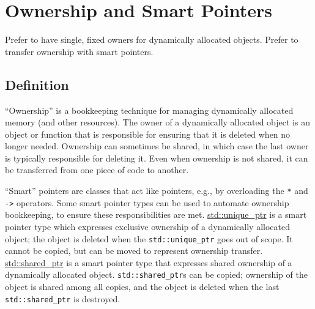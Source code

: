 
\section{Ownership and Smart Pointers}\label{sec:ownership-and-smart-pointers}
Prefer to have single, fixed owners for dynamically allocated objects. Prefer to transfer ownership with smart pointers.

\subsection{Definition}
\enquote{Ownership} is a bookkeeping technique for managing dynamically allocated memory (and other resources). The owner of a dynamically allocated object is an object or function that is responsible for ensuring that it is deleted when no longer needed. Ownership can sometimes be shared, in which case the last owner is typically responsible for deleting it. Even when ownership is not shared, it can be transferred from one piece of code to another.

\enquote{Smart} pointers are classes that act like pointers, e.g., by overloading the \texttt{*} and \texttt{->} operators. Some smart pointer types can be used to automate ownership bookkeeping, to ensure these responsibilities are met. \href{http://en.cppreference.com/w/cpp/memory/unique_ptr}{std::unique\_ptr} is a smart pointer type which expresses exclusive ownership of a dynamically allocated object; the object is deleted when the \texttt{std::unique_ptr} goes out of scope. It cannot be copied, but can be moved to represent ownership transfer. \href{http://en.cppreference.com/w/cpp/memory/shared_ptr}{std::shared\_ptr} is a smart pointer type that expresses shared ownership of a dynamically allocated object. \texttt{std::shared_ptr}s can be copied; ownership of the object is shared among all copies, and the object is deleted when the last \texttt{std::shared_ptr} is destroyed.

